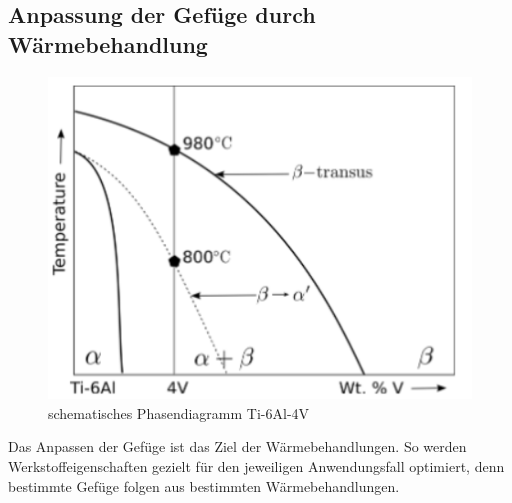 \documentclass[a4paper, 11pt]{tubsreprt}
\begin{document}
\subsection*{Anpassung der Gefüge durch Wärmebehandlung}
\begin{figure}
	\centering
	\includegraphics[scale=0.9]{Bilder/Phasendiagram.PNG}
	\caption[Phasendiagramm]{schematisches Phasendiagramm Ti-6Al-4V \cite{Babu2008}}
	\label{fig2}
\end{figure}
Das Anpassen der Gefüge ist das Ziel der Wärmebehandlungen. So werden Werkstoffeigenschaften gezielt für den jeweiligen Anwendungsfall optimiert, denn bestimmte Gefüge folgen aus bestimmten Wärmebehandlungen. 



\listoffigures
\listoftables
\end{document}

